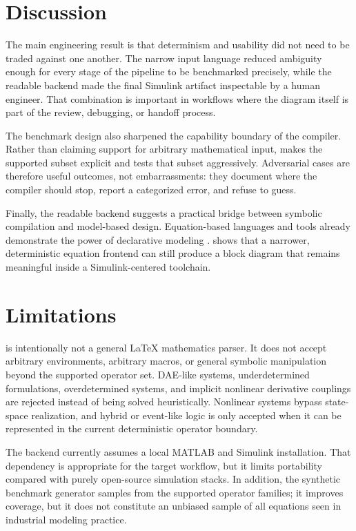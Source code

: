 \documentclass[colorlinks,upint,subscriptcorrection,varvw,balance,nofoot]{asmeconf}
\newcommand{\EqnToSim}{\NoCaseChange{Eqn2Sim}}
\begin{document}
\section{Discussion}
The main engineering result is that determinism and usability did not need to be traded against one another. The narrow input language reduced ambiguity enough for every stage of the pipeline to be benchmarked precisely, while the readable backend made the final Simulink artifact inspectable by a human engineer. That combination is important in workflows where the diagram itself is part of the review, debugging, or handoff process.

The benchmark design also sharpened the capability boundary of the compiler. Rather than claiming support for arbitrary mathematical input, \EqnToSim{} makes the supported subset explicit and tests that subset aggressively. Adversarial cases are therefore useful outcomes, not embarrassments: they document where the compiler should stop, report a categorized error, and refuse to guess.

Finally, the readable backend suggests a practical bridge between symbolic compilation and model-based design. Equation-based languages and tools already demonstrate the power of declarative modeling \cite{fritzson1998modelica,fritzson2020openmodelica}. \EqnToSim{} shows that a narrower, deterministic equation frontend can still produce a block diagram that remains meaningful inside a Simulink-centered toolchain.

\section{Limitations}
\EqnToSim{} is intentionally not a general \LaTeX{} mathematics parser. It does not accept arbitrary environments, arbitrary macros, or general symbolic manipulation beyond the supported operator set. DAE-like systems, underdetermined formulations, overdetermined systems, and implicit nonlinear derivative couplings are rejected instead of being solved heuristically. Nonlinear systems bypass state-space realization, and hybrid or event-like logic is only accepted when it can be represented in the current deterministic operator boundary.

The backend currently assumes a local MATLAB and Simulink installation. That dependency is appropriate for the target workflow, but it limits portability compared with purely open-source simulation stacks. In addition, the synthetic benchmark generator samples from the supported operator families; it improves coverage, but it does not constitute an unbiased sample of all equations seen in industrial modeling practice.
\end{document}
